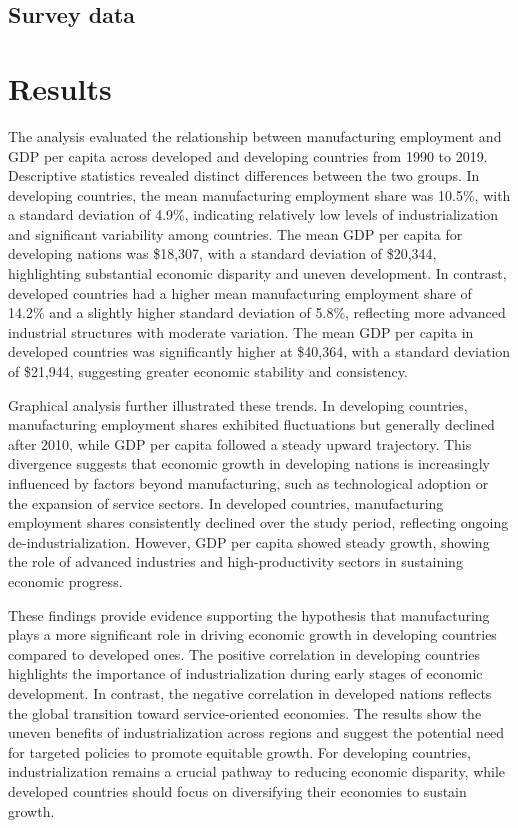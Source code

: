 \documentclass[12pt]{article}
\begin{document}
\subsection{Survey data}

\section{Results}
\label{sec:result}


The analysis evaluated the relationship between manufacturing employment and GDP per capita across developed and developing countries from 1990 to 2019. Descriptive statistics revealed distinct differences between the two groups. In developing countries, the mean manufacturing employment share was 10.5\%, with a standard deviation of 4.9\%, indicating relatively low levels of industrialization and significant variability among countries. The mean GDP per capita for developing nations was \$18,307, with a standard deviation of \$20,344, highlighting substantial economic disparity and uneven development. In contrast, developed countries had a higher mean manufacturing employment share of 14.2\% and a slightly higher standard deviation of 5.8\%, reflecting more advanced industrial structures with moderate variation. The mean GDP per capita in developed countries was significantly higher at \$40,364, with a standard deviation of \$21,944, suggesting greater economic stability and consistency.

Graphical analysis further illustrated these trends. In developing countries, manufacturing employment shares exhibited fluctuations but generally declined after 2010, while GDP per capita followed a steady upward trajectory. This divergence suggests that economic growth in developing nations is increasingly influenced by factors beyond manufacturing, such as technological adoption or the expansion of service sectors. In developed countries, manufacturing employment shares consistently declined over the study period, reflecting ongoing de-industrialization. However, GDP per capita showed steady growth, showing the role of advanced industries and high-productivity sectors in sustaining economic progress.

These findings provide evidence supporting the hypothesis that manufacturing plays a more significant role in driving economic growth in developing countries compared to developed ones. The positive correlation in developing countries highlights the importance of industrialization during early stages of economic development. In contrast, the negative correlation in developed nations reflects the global transition toward service-oriented economies. The results show the uneven benefits of industrialization across regions and suggest the potential need for targeted policies to promote equitable growth. For developing countries, industrialization remains a crucial pathway to reducing economic disparity, while developed countries should focus on diversifying their economies to sustain growth.
\end{document}
